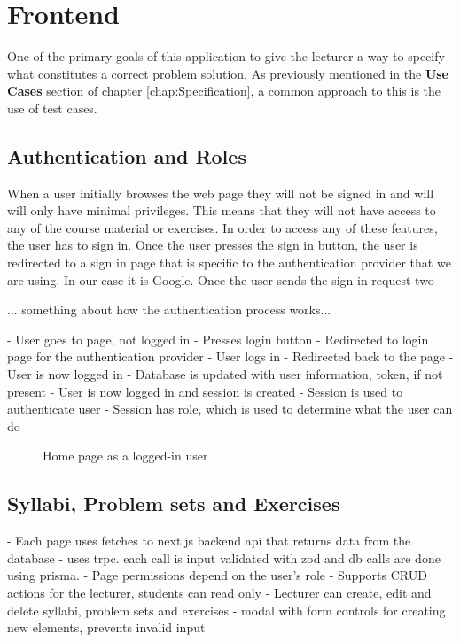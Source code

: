 \chapter{Frontend} \label{chap:Frontend}
One of the primary goals of this application to give the lecturer a way to specify what constitutes a correct problem solution.
As previously mentioned in the \textbf{Use Cases} section of chapter \ref{chap:Specification}, a common approach to this is the use of test cases.

\section{Authentication and Roles}
When a user initially browses the web page they will not be signed in and will will only have minimal privileges. This means that they will not have access to any of the course material or exercises. In order to access any of these features, the user has to sign in. Once the user presses the sign in button, the user is redirected to a sign in page that is specific to the authentication provider that we are using. In our case it is Google. Once the user sends the sign in request two

... something about how the authentication process works...



- User goes to page, not logged in
- Presses login button
- Redirected to login page for the authentication provider
- User logs in
- Redirected back to the page
- User is now logged in
- Database is updated with user information, token, if not present
- User is now logged in and session is created
- Session is used to authenticate user
- Session has role, which is used to determine what the user can do

\begin{figure}[H]
    \centering
    \caption{Home page as a logged-in user}
    \label{fig:Home page}
\end{figure}

\section{Syllabi, Problem sets and Exercises}
- Each page uses fetches to next.js backend api that returns data from the database
    - uses trpc. each call is input validated with zod and db calls are done using prisma.
- Page permissions depend on the user's role
- Supports CRUD actions for the lecturer, students can read only
- Lecturer can create, edit and delete syllabi, problem sets and exercises
- modal with form controls for creating new elements, prevents invalid input

